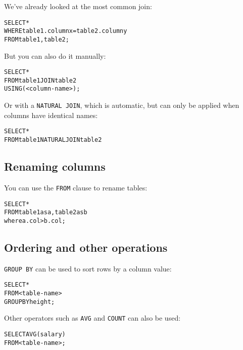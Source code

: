 \begin{mymulticols}
  We've already looked at the most common join:

  \begin{alltt}
  	SELECT *\\
  	WHERE table1.columnx = table2.columny\\
  	FROM table1, table2;
  \end{alltt}

  But you can also do it manually:

  \begin{alltt}
  	SELECT *\\
  	FROM table1 JOIN table2\\
  	USING (<column-name>);
  \end{alltt}

  Or with a \texttt{NATURAL JOIN}, which is automatic, but can only be applied
  when columns have identical names:

  \begin{alltt}
  	SELECT *\\
  	FROM table1 NATURAL JOIN table2
  \end{alltt}

  \subsection{Renaming columns}

  You can use the \texttt{FROM} clause to rename tables:

  \begin{alltt}
  	SELECT *\\
  	FROM table1 as a, table2 as b\\
  	where a.col > b.col;
  \end{alltt}

  \subsection{Ordering and other operations}

  \texttt{GROUP BY} can be used to sort rows by a column value:

  \begin{alltt}
  	SELECT *\\
  	FROM <table-name>\\
  	GROUP BY height;
  \end{alltt}

  Other operators such as \texttt{AVG} and \texttt{COUNT} can also be used:

  \begin{alltt}
  	SELECT AVG(salary)\\
  	FROM <table-name>;	
  \end{alltt}


\end{mymulticols}
